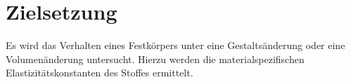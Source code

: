 
\section{Zielsetzung}
\label{sec:Zielsetzung}
Es wird das Verhalten eines Festkörpers unter eine Gestaltsänderung oder
 eine Volumenänderung untersucht. Hierzu werden die
  materialspezifischen Elastizitätskonstanten des Stoffes ermittelt.
